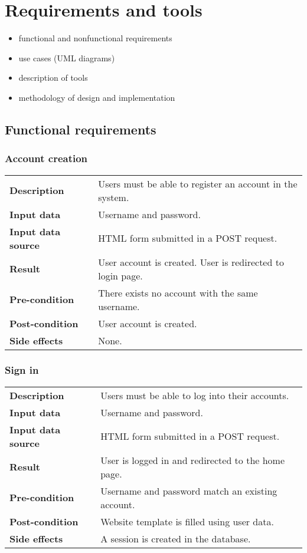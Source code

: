 \chapter{Requirements and tools}

\begin{itemize}
\item functional and nonfunctional requirements
\item use cases (UML diagrams)
\item description of tools
\item methodology of design and implementation
\end{itemize}

\section{Functional requirements}

\subsection{Account creation}

\begin{tabular}{ l l }
	\textbf{Description} & Users must be able to register an account in the system.\\
	\textbf{Input data} & Username and password.\\
	\textbf{Input data source} & HTML form submitted in a POST request.\\
	\textbf{Result} & User account is created. User is redirected to login page.\\
	\textbf{Pre-condition} & There exists no account with the same username.\\
	\textbf{Post-condition} & User account is created.\\
	\textbf{Side effects} & None.
\end{tabular}

\subsection{Sign in}

\begin{tabular}{ l l }
	\textbf{Description} & Users must be able to log into their accounts.\\
	\textbf{Input data} & Username and password.\\
	\textbf{Input data source} & HTML form submitted in a POST request.\\
	\textbf{Result} & User is logged in and redirected to the home page.\\
	\textbf{Pre-condition} & Username and password match an existing account.\\
	\textbf{Post-condition} & Website template is filled using user data.\\
	\textbf{Side effects} & A session is created in the database.
\end{tabular}


